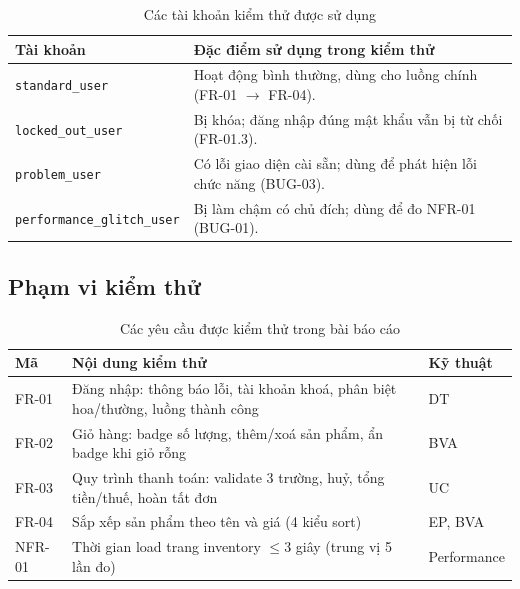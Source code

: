 \documentclass[12pt,a4paper]{article}
\newcommand{\tablestyle}{\small\renewcommand{\arraystretch}{1.25}}
\newcommand{\hrow}{\rowcolor{tablehead}}
\begin{document}
\begin{table}[H]
\centering
\tablestyle
\caption{Các tài khoản kiểm thử được sử dụng}
\label{tab:accounts}
\begin{tabularx}{\textwidth}{L{5.0cm}Y}
\toprule
\hrow \textbf{Tài khoản} & \textbf{Đặc điểm sử dụng trong kiểm thử} \\
\midrule
\texttt{standard\_user} & Hoạt động bình thường, dùng cho luồng chính (FR-01 $\rightarrow$ FR-04). \\
\texttt{locked\_out\_user} & Bị khóa; đăng nhập đúng mật khẩu vẫn bị từ chối (FR-01.3). \\
\texttt{problem\_user} & Có lỗi giao diện cài sẵn; dùng để phát hiện lỗi chức năng (BUG-03). \\
\texttt{performance\_glitch\_user} & Bị làm chậm có chủ đích; dùng để đo NFR-01 (BUG-01). \\
\bottomrule
\end{tabularx}
\end{table}

\subsection{Phạm vi kiểm thử}
\begin{table}[H]
\centering
\tablestyle
\caption{Các yêu cầu được kiểm thử trong bài báo cáo}
\label{tab:scope}
\begin{tabularx}{\textwidth}{L{2.0cm}YL{2.6cm}}
\toprule
\hrow \textbf{Mã} & \textbf{Nội dung kiểm thử} & \textbf{Kỹ thuật} \\
\midrule
FR-01 & Đăng nhập: thông báo lỗi, tài khoản khoá, phân biệt hoa/thường, luồng thành công & DT \\
FR-02 & Giỏ hàng: badge số lượng, thêm/xoá sản phẩm, ẩn badge khi giỏ rỗng & BVA \\
FR-03 & Quy trình thanh toán: validate 3 trường, huỷ, tổng tiền/thuế, hoàn tất đơn & UC \\
FR-04 & Sắp xếp sản phẩm theo tên và giá (4 kiểu sort) & EP, BVA \\
NFR-01 & Thời gian load trang inventory $\leq 3$ giây (trung vị 5 lần đo) & Performance \\
\bottomrule
\end{tabularx}
\end{table}
\end{document}

